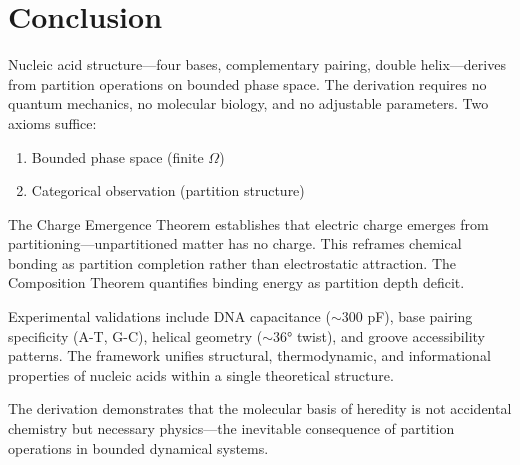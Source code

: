 \documentclass[twocolumn,10pt,a4paper]{article}
\theoremstyle{definition}
\theoremstyle{remark}
\begin{document}
\section{Conclusion}
\label{sec:conclusion}

Nucleic acid structure---four bases, complementary pairing, double helix---derives from partition operations on bounded phase space. The derivation requires no quantum mechanics, no molecular biology, and no adjustable parameters. Two axioms suffice:

\begin{enumerate}
    \item Bounded phase space (finite $\Omega$)
    \item Categorical observation (partition structure)
\end{enumerate}

The Charge Emergence Theorem establishes that electric charge emerges from partitioning---unpartitioned matter has no charge. This reframes chemical bonding as partition completion rather than electrostatic attraction. The Composition Theorem quantifies binding energy as partition depth deficit.

Experimental validations include DNA capacitance ($\sim 300$ pF), base pairing specificity (A-T, G-C), helical geometry ($\sim 36°$ twist), and groove accessibility patterns. The framework unifies structural, thermodynamic, and informational properties of nucleic acids within a single theoretical structure.

The derivation demonstrates that the molecular basis of heredity is not accidental chemistry but necessary physics---the inevitable consequence of partition operations in bounded dynamical systems.



\end{document}
